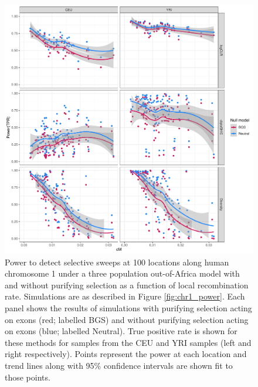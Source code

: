 \documentclass[hidelinks]{article}
\begin{document}
    \begin{figure}
        \centering
        \includegraphics[width=0.8 \textwidth]{figures/sweeps/relationship_power_cM.pdf}
        \caption{
        Power to detect selective sweeps at 100 locations along human chromosome 1 under a three population out-of-Africa model \citep{gutenkunst2009inferring}  
        with and without purifying selection as a function of local recombination rate.
        Simulations are as described in Figure \ref{fig:chr1_power}.
        Each panel shows the results of simulations with purifying selection acting on exons (red; labelled BGS)
        and without purifying selection acting on exons (blue; labelled Neutral).
        True positive rate is shown for these methods for samples from the CEU and YRI samples (left and right respectively).
        Points represent the power at each location and trend lines along with 95\% confidence intervals are shown fit to those points.
        }
        \label{fig:power-recomb}
    \end{figure}
\end{document}
